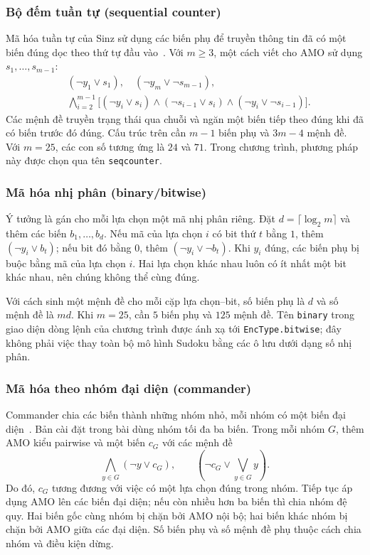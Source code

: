 \documentclass[a4paper,fleqn]{cas-sc}
\begin{document}
\subsubsection{Bộ đếm tuần tự (sequential counter)}

Mã hóa tuần tự của Sinz sử dụng các biến phụ để truyền thông tin đã có
một biến đúng dọc theo thứ tự đầu vào~.
Với $m\geq3$, một cách viết cho AMO sử dụng $s_1,\ldots,s_{m-1}$:
\begin{align}
 &(\neg y_1\lor s_1),\quad(\neg y_m\lor\neg s_{m-1}),
 \nonumber\\
 &\bigwedge_{i=2}^{m-1}
 \bigl[(\neg y_i\lor s_i)
 \land(\neg s_{i-1}\lor s_i)
 \land(\neg y_i\lor\neg s_{i-1})\bigr].
 \label{eq:theory-sequential}
\end{align}
Các mệnh đề truyền trạng thái qua chuỗi và ngăn một biến tiếp theo đúng
khi đã có biến trước đó đúng. Cấu trúc trên cần $m-1$ biến phụ và
$3m-4$ mệnh đề. Với $m=25$, các con số tương ứng là $24$ và $71$.
Trong chương trình, phương pháp này được chọn qua tên
\texttt{seqcounter}.

\subsubsection{Mã hóa nhị phân (binary/bitwise)}

Ý tưởng là gán cho mỗi lựa chọn một mã nhị phân riêng. Đặt
$d=\lceil\log_2m\rceil$ và thêm các biến $b_1,\ldots,b_d$.
Nếu mã của lựa chọn $i$ có bit thứ $t$ bằng $1$, thêm
$(\neg y_i\lor b_t)$; nếu bit đó bằng $0$, thêm
$(\neg y_i\lor\neg b_t)$. Khi $y_i$ đúng, các biến phụ bị buộc bằng
mã của lựa chọn $i$. Hai lựa chọn khác nhau luôn có ít nhất một bit khác
nhau, nên chúng không thể cùng đúng.

Với cách sinh một mệnh đề cho mỗi cặp lựa chọn--bit, số biến phụ là $d$
và số mệnh đề là $md$. Khi $m=25$, cần $5$ biến phụ và $125$ mệnh đề.
Tên \texttt{binary} trong giao diện dòng lệnh của chương trình được ánh
xạ tới \texttt{EncType.bitwise}; đây không phải việc thay toàn bộ mô hình
Sudoku bằng các ô lưu dưới dạng số nhị phân.

\subsubsection{Mã hóa theo nhóm đại diện (commander)}

Commander chia các biến thành những nhóm nhỏ, mỗi nhóm có một biến
đại diện~. Bản cài đặt trong bài dùng nhóm tối đa ba
biến. Trong mỗi nhóm $G$, thêm AMO kiểu pairwise và một biến $c_G$ với
các mệnh đề
\begin{equation}
 \bigwedge_{y\in G}(\neg y\lor c_G),
 \qquad \left(\neg c_G\lor\bigvee_{y\in G}y\right).
 \label{eq:theory-commander}
\end{equation}
Do đó, $c_G$ tương đương với việc có một lựa chọn đúng trong nhóm.
Tiếp tục áp dụng AMO lên các biến đại diện; nếu còn nhiều hơn ba biến
thì chia nhóm đệ quy. Hai biến gốc cùng nhóm bị chặn bởi AMO nội bộ;
hai biến khác nhóm bị chặn bởi AMO giữa các đại diện.
Số biến phụ và số mệnh đề phụ thuộc cách chia nhóm và điều kiện dừng.
\end{document}
